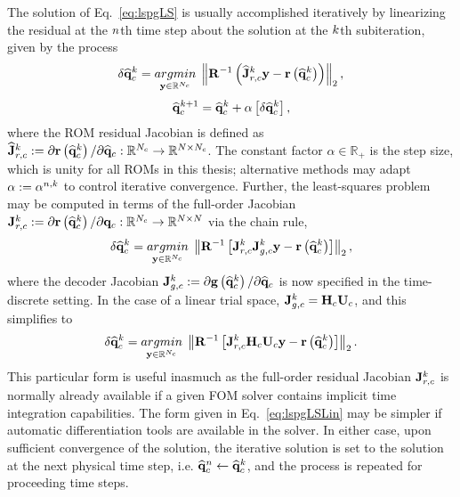 The solution of Eq.~\ref{eq:lspgLS} is usually accomplished iteratively by linearizing the residual at the $n$th time step about the solution at the $k$th subiteration, given by the process
%
\begin{equation}\label{eq:lspgLSLin}
    \delta \consVecCoef^{\newtonIdx} = \argmin{\dummyVec \inROne{\numConsModes}} \left\Vert \resScaleInv \left(\jacobResCoefCons^{\newtonIdx} \dummyVec - \resFunc{\consVecCoef^{\newtonIdx}}\right) \right\Vert_2,
\end{equation}
\begin{equation}
    \mathbf{\widehat{q}}_{c}^{k + 1} = \mathbf{\widehat{q}}_{c}^{k} + \alpha \left[ \delta \mathbf{\widehat{q}}_{c}^{k} \right],
\end{equation}
%
where the ROM residual Jacobian is defined as $\mathbf{\widehat{J}}_{r,c}^{k} := \partial \mathbf{r}\left(\mathbf{\widehat{q}}_{c}^{k}\right) / \partial \mathbf{\widehat{q}}_{c}: \mathbb{R}^{N_c} \rightarrow \mathbb{R}^{N \times N_c}$. The constant factor $\alpha \in \mathbb{R}_+$ is the step size, which is unity for all ROMs in this thesis; alternative methods may adapt $\alpha := \alpha^{n,k}$ to control iterative convergence. Further, the least-squares problem may be computed in terms of the full-order Jacobian $\mathbf{J}_{r,c}^{k} := \partial \mathbf{r}\left(\mathbf{\widehat{q}}_{c}^{k}\right) / \partial \mathbf{q}_{c}: \mathbb{R}^{N_c} \rightarrow \mathbb{R}^{N \times N}$ via the chain rule,
%
\begin{equation}
    \delta \consVecCoef^{\newtonIdx} = \argmin{\dummyVec \inROne{\numConsModes}} \left\Vert \resScaleInv \left[\jacobResCons^{\newtonIdx} \jacobDecodeCons^{\newtonIdx} \dummyVec - \resFunc{\consVecCoef^{\newtonIdx}}\right] \right\Vert_2,
\end{equation}
%
where the decoder Jacobian $\mathbf{J}_{g,c}^{k} := \partial \mathbf{g} \left(\mathbf{\widehat{q}}_{c}^{k}\right) / \partial \mathbf{\widehat{q}}_{c}$ is now specified in the time-discrete setting. In the case of a linear trial space, $\jacobDecodeCons^{\newtonIdx} = \consScale \consTrial$, and this simplifies to
%
\begin{equation}
    \delta \consVecCoef^{\newtonIdx} = \argmin{\dummyVec \inROne{\numConsModes}} \left\Vert \resScaleInv \left[\jacobResCons^{\newtonIdx} \consScale \consTrial \dummyVec - \resFunc{\consVecCoef^{\newtonIdx}}\right] \right\Vert_2.
\end{equation}
%
This particular form is useful inasmuch as the full-order residual Jacobian $\mathbf{J}_{r,c}^{k}$ is normally already available if a given FOM solver contains implicit time integration capabilities. The form given in Eq.~\ref{eq:lspgLSLin} may be simpler if automatic differentiation tools are available in the solver. In either case, upon sufficient convergence of the solution, the iterative solution is set to the solution at the next physical time step, i.e. $\mathbf{\widehat{q}}_{c}^{n} \leftarrow \mathbf{\widehat{q}}_{c}^{k}$, and the process is repeated for proceeding time steps.

